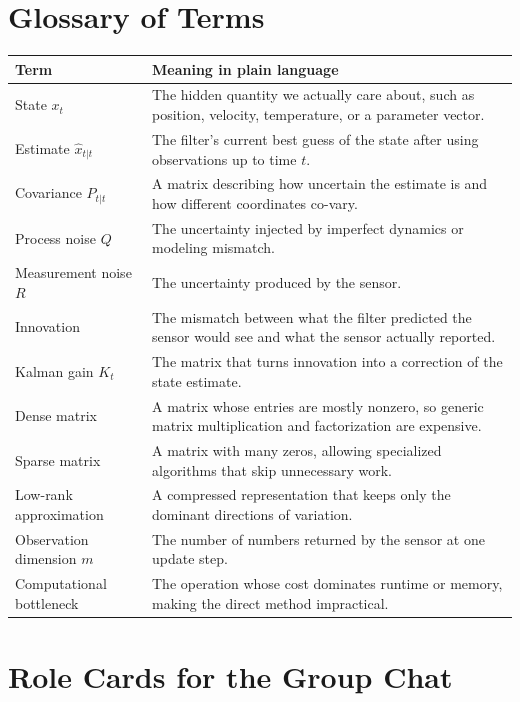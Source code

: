 \documentclass[12pt,a4paper]{article}
\begin{document}
\section{Glossary of Terms}\label{app:glossary}

\begin{longtable}{>{\raggedright\arraybackslash}p{3.2cm} >{\raggedright\arraybackslash}p{10.2cm}}
\toprule
Term & Meaning in plain language \\
\midrule
\endhead
State \(x_t\) & The hidden quantity we actually care about, such as position, velocity, temperature, or a parameter vector. \\
Estimate \(\hat{x}_{t|t}\) & The filter's current best guess of the state after using observations up to time \(t\). \\
Covariance \(P_{t|t}\) & A matrix describing how uncertain the estimate is and how different coordinates co-vary. \\
Process noise \(Q\) & The uncertainty injected by imperfect dynamics or modeling mismatch. \\
Measurement noise \(R\) & The uncertainty produced by the sensor. \\
Innovation & The mismatch between what the filter predicted the sensor would see and what the sensor actually reported. \\
Kalman gain \(K_t\) & The matrix that turns innovation into a correction of the state estimate. \\
Dense matrix & A matrix whose entries are mostly nonzero, so generic matrix multiplication and factorization are expensive. \\
Sparse matrix & A matrix with many zeros, allowing specialized algorithms that skip unnecessary work. \\
Low-rank approximation & A compressed representation that keeps only the dominant directions of variation. \\
Observation dimension \(m\) & The number of numbers returned by the sensor at one update step. \\
Computational bottleneck & The operation whose cost dominates runtime or memory, making the direct method impractical. \\
\bottomrule
\end{longtable}

\section{Role Cards for the Group Chat}\label{app:role-cards}
\end{document}
